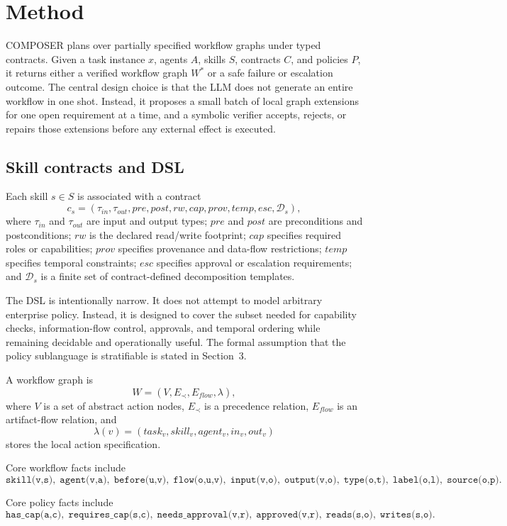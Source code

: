 \documentclass[11pt]{article}
\begin{document}
\section{Method}
COMPOSER plans over partially specified workflow graphs under typed contracts. Given a task instance $x$, agents $A$, skills $S$, contracts $C$, and policies $P$, it returns either a verified workflow graph $W^*$ or a safe failure or escalation outcome. The central design choice is that the LLM does not generate an entire workflow in one shot. Instead, it proposes a small batch of local graph extensions for one open requirement at a time, and a symbolic verifier accepts, rejects, or repairs those extensions before any external effect is executed.

\subsection{Skill contracts and DSL}
Each skill $s \in S$ is associated with a contract
\[
c_s=(\tau_{in},\tau_{out},pre,post,rw,cap,prov,temp,esc,\mathcal{D}_s),
\]
where $\tau_{in}$ and $\tau_{out}$ are input and output types; $pre$ and $post$ are preconditions and postconditions; $rw$ is the declared read/write footprint; $cap$ specifies required roles or capabilities; $prov$ specifies provenance and data-flow restrictions; $temp$ specifies temporal constraints; $esc$ specifies approval or escalation requirements; and $\mathcal{D}_s$ is a finite set of contract-defined decomposition templates.

The DSL is intentionally narrow. It does not attempt to model arbitrary enterprise policy. Instead, it is designed to cover the subset needed for capability checks, information-flow control, approvals, and temporal ordering while remaining decidable and operationally useful. The formal assumption that the policy sublanguage is stratifiable is stated in Section~3.

A workflow graph is
\[
W=(V,E_{\prec},E_{flow},\lambda),
\]
where $V$ is a set of abstract action nodes, $E_{\prec}$ is a precedence relation, $E_{flow}$ is an artifact-flow relation, and
\[
\lambda(v)=(task_v,skill_v,agent_v,in_v,out_v)
\]
stores the local action specification.

Core workflow facts include
\[
\texttt{skill(v,s)},\; \texttt{agent(v,a)},\; \texttt{before(u,v)},\; \texttt{flow(o,u,v)},\; \texttt{input(v,o)},\; \texttt{output(v,o)},\; \texttt{type(o,t)},\; \texttt{label(o,l)},\; \texttt{source(o,p)}.
\]

Core policy facts include
\[
\texttt{has\_cap(a,c)},\; \texttt{requires\_cap(s,c)},\; \texttt{needs\_approval(v,r)},\; \texttt{approved(v,r)},\; \texttt{reads(s,o)},\; \texttt{writes(s,o)}.
\]
\end{document}
